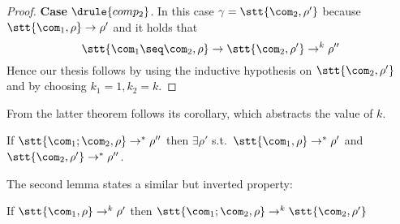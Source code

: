 \begin{proof}
  \medskip

  \textbf{Case} \(\drule{comp_2}\). In this case
  \({\gamma = \stt{\com_2, \rho'}}\) because
  \({\stt{\com_1, \rho}\to\rho'}\) and it holds that
  \begin{equation*}
    \stt{\com_1\seq\com_2, \rho}\to\stt{\com_2, \rho'} \to^k \rho''
  \end{equation*}
  Hence our thesis follows by using the inductive hypothesis on
  \(\stt{\com_2, \rho'}\) and by choosing \({k_1 = 1}, {k_2 = k}\).
\end{proof}

From the latter theorem follows its corollary, which abstracts the
value of \(k\).

\begin{corollary}\label{co:decomp}
  If \(\stt{\com_1;\com_2, \rho} \to^* \rho''\) then \(\exists \rho'\)
  s.t.~\(\stt{\com_1, \rho} \to^* \rho'\) and
  \(\stt{\com_2, \rho'}\to^* \rho''\).
\end{corollary}

The second lemma states a similar but inverted property:

\begin{lemma}\label{le:comp}
  If \(\stt{\com_1, \rho} \to^k \rho'\) then
  \(\stt{\com_1; \com_2, \rho} \to^k \stt{\com_2, \rho'}\)
\end{lemma}

